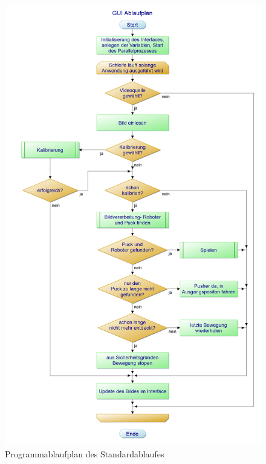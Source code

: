 \begin{figure}[h]
\includegraphics[scale =0.3]{images/gui_pap}
 \caption{Programmablaufplan des Standardablaufes}
 \label{gui_pap}

\end{figure}

